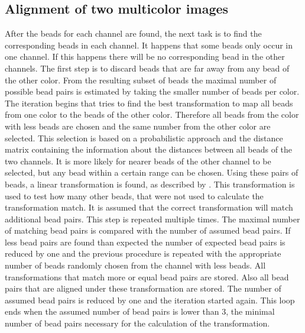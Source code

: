 \subsection{Alignment of two multicolor images}
After the beads for each channel are found, the next task is to find the corresponding
beads in each channel. It happens that some beads only occur in one channel.
If this happens there will be no corresponding bead in the other
channels.\newline
The first step is to discard beads that are far away from any bead of the other color. From the resulting subset of beads the maximal number of possible bead pairs is estimated by taking the smaller number of beads per color.\newline
The iteration begins that tries to find the best transformation to map all beads from one color to the beads of the other color. Therefore all beads from the color with less beads are chosen and the same number from the other color are selected. This selection is based on
a probabilistic approach and the distance matrix containing the information about the
distances between all beads of the two channels. It is more likely for nearer beads of the other channel to be selected, but any bead within a certain range can be chosen.\newline
Using these pairs of beads, a linear transformation is found, as described by
\cite{MAJoachim}.\newline
This transformation is used to test how many other beads, that were not used to calculate the transformation match. It is assumed that the correct transformation will match additional bead pairs. 
This step is repeated multiple times.\newline
The maximal number of matching bead pairs is compared with the number of assumed bead pairs. If less bead pairs are found than expected the number of expected bead pairs is reduced by one and the previous procedure is repeated with the appropriate number of beads randomly chosen from the channel with less beads.\newline
All transformations that match more or equal bead pairs are stored. Also all bead pairs that are aligned under these transformation are stored. The number of assumed bead pairs is reduced by one and the iteration started again. \newline
This loop ends when the assumed number of bead pairs is lower than 3, the minimal number of bead pairs necessary for the calculation of the transformation.\newline
